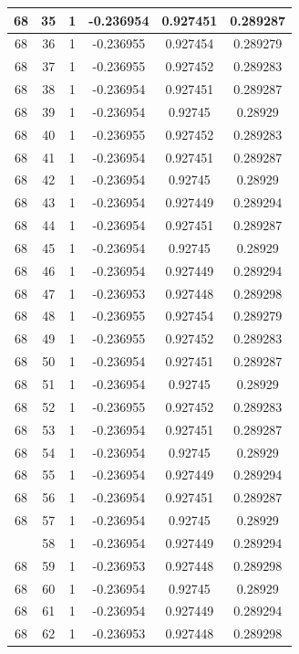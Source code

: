 \documentclass[12pt,a4paper]{article}
\numberwithin{equation}{section}
\numberwithin{figure}{section}
\numberwithin{table}{section}
\begin{document}
\begin{longtable}{|c|c|c|c|c|c|}
68 & 35 & 1 & -0.236954 & 0.927451 & 0.289287 \\ \hline
68 & 36 & 1 & -0.236955 & 0.927454 & 0.289279 \\ \hline
68 & 37 & 1 & -0.236955 & 0.927452 & 0.289283 \\ \hline
68 & 38 & 1 & -0.236954 & 0.927451 & 0.289287 \\ \hline
68 & 39 & 1 & -0.236954 & 0.92745 & 0.28929 \\ \hline
68 & 40 & 1 & -0.236955 & 0.927452 & 0.289283 \\ \hline
68 & 41 & 1 & -0.236954 & 0.927451 & 0.289287 \\ \hline
68 & 42 & 1 & -0.236954 & 0.92745 & 0.28929 \\ \hline
68 & 43 & 1 & -0.236954 & 0.927449 & 0.289294 \\ \hline
68 & 44 & 1 & -0.236954 & 0.927451 & 0.289287 \\ \hline
68 & 45 & 1 & -0.236954 & 0.92745 & 0.28929 \\ \hline
68 & 46 & 1 & -0.236954 & 0.927449 & 0.289294 \\ \hline
68 & 47 & 1 & -0.236953 & 0.927448 & 0.289298 \\ \hline
68 & 48 & 1 & -0.236955 & 0.927454 & 0.289279 \\ \hline
68 & 49 & 1 & -0.236955 & 0.927452 & 0.289283 \\ \hline
68 & 50 & 1 & -0.236954 & 0.927451 & 0.289287 \\ \hline
68 & 51 & 1 & -0.236954 & 0.92745 & 0.28929 \\ \hline
68 & 52 & 1 & -0.236955 & 0.927452 & 0.289283 \\ \hline
68 & 53 & 1 & -0.236954 & 0.927451 & 0.289287 \\ \hline
68 & 54 & 1 & -0.236954 & 0.92745 & 0.28929 \\ \hline
68 & 55 & 1 & -0.236954 & 0.927449 & 0.289294 \\ \hline
68 & 56 & 1 & -0.236954 & 0.927451 & 0.289287 \\ \hline
68 & 57 & 1 & -0.236954 & 0.92745 & 0.28929 \\ \hline
\pagebreak
68 & 58 & 1 & -0.236954 & 0.927449 & 0.289294 \\ \hline
68 & 59 & 1 & -0.236953 & 0.927448 & 0.289298 \\ \hline
68 & 60 & 1 & -0.236954 & 0.92745 & 0.28929 \\ \hline
68 & 61 & 1 & -0.236954 & 0.927449 & 0.289294 \\ \hline
68 & 62 & 1 & -0.236953 & 0.927448 & 0.289298 \\ \hline

\end{longtable}
\end{document}
